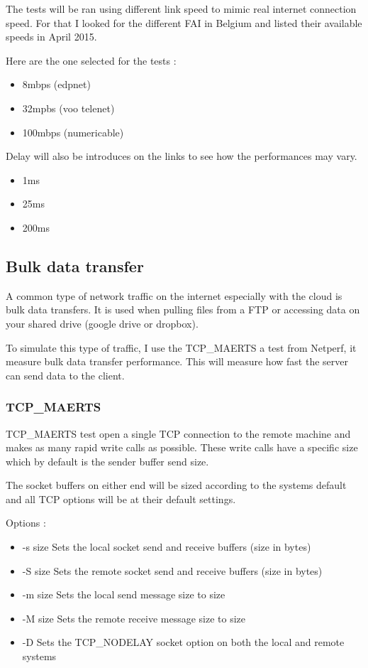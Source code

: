  The tests will be ran using different link speed to mimic real internet connection speed.
  For that I looked for the different FAI in Belgium and listed their available speeds in April 2015.

  Here are the one selected for the tests :
  \begin{itemize}
    \item  8mbps (edpnet)
    \item  32mpbs (voo telenet)
    \item  100mbps (numericable)
  \end{itemize}

  Delay will also be introduces on the links to see how the performances may vary.
  \begin{itemize}
    \item  1ms
    \item  25ms
    \item  200ms
  \end{itemize}

  \subsection{Bulk data transfer}

  A common type of network traffic on the internet especially with the cloud is bulk data transfers.
  It is used when pulling files from a FTP or accessing data on your shared drive (google drive or dropbox).

  To simulate this type of traffic, I use the TCP\_MAERTS a test from Netperf, it measure bulk data transfer performance. This will measure how fast the server can send data to the client.

  \subsubsection{TCP\_MAERTS}

  TCP\_MAERTS test open a single TCP connection to the remote machine and makes as many rapid write calls as possible. These write calls have a specific size which by default is the sender buffer send size.

  The socket buffers on either end will be sized according to the systems default and all TCP options will be at their default settings.

  Options :
  \begin{itemize}
\item -s size Sets the local socket send and receive buffers (size in bytes)
\item -S size Sets the remote socket send and receive buffers (size in bytes)
\item -m size Sets the local send message size to size
\item -M size Sets the remote receive message size to size
\item -D Sets the TCP\_NODELAY socket option on both the local and
remote systems
  \end{itemize}

